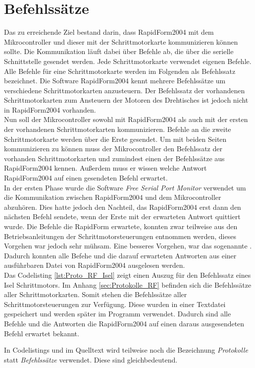 \section{Befehlssätze} 
\label{sec:Protokolle}
Das zu erreichende Ziel bestand darin, dass RapidForm2004 mit dem Mikrocontroller und dieser mit der Schrittmotorkarte kommunizieren können sollte. Die Kommunikation läuft dabei über Befehle ab, die über die serielle Schnittstelle gesendet werden. 
Jede Schrittmotorkarte verwendet eigenen Befehle. Alle Befehle für eine Schrittmotorkarte werden im Folgenden als Befehlssatz bezeichnet. Die Software RapidForm2004 kennt mehrere Befehlssätze um verschiedene Schrittmotorkarten anzusteuern. Der Befehlssatz der vorhandenen Schrittmotorkarten zum Ansteuern der Motoren des Drehtisches ist jedoch nicht in RapidForm2004 vorhanden.\\
Nun soll der Mikrocontroller sowohl mit RapidForm2004 als auch mit der ersten der vorhandenen Schrittmotorkarten kommunizieren. Befehle an die zweite Schrittmotorkarte werden über die Erste gesendet. Um mit beiden Seiten kommunizieren zu können muss der Mikrocontroller den Befehlssatz der vorhanden Schrittmotorkarten und zumindest einen der Befehlssätze aus RapidForm2004 kennen. Außerdem muss er wissen welche Antwort RapidForm2004 auf einen gesendeten Befehl erwartet. \\
In der ersten Phase wurde die Software \emph{Free Serial Port Monitor} verwendet um die Kommunikation zwischen RapidForm2004 und dem Mikrocontroller abzuhören. Dies hatte jedoch den Nachteil, das RapidForm2004 erst dann den nächsten Befehl sendete, wenn der Erste mit der erwarteten Antwort quittiert wurde. Die Befehle die RapidForm erwartete, konnten zwar teilweise aus den Betriebsanleitungen der Schrittmotorsteuerungen entnommen werden, dieses Vorgehen war jedoch sehr mühsam. Eine besseres Vorgehen, war das sogenannte . Dadurch konnten alle Befehe und die darauf erwarteten Antworten aus einer ausführbaren Datei von RapidForm2004 ausgelesen werden.\\
Das Codelisting \ref{lst:Proto_RF_Isel} zeigt einen Auszug für den Befehlssatz eines Isel Schrittmotors. Im Anhang \ref{sec:Protokolle_RF} befinden sich die Befehlssätze aller Schrittmotorkarten. Somit stehen die Befehlssätze aller Schrittmotorsteuerungen zur Verfügung. Diese wurden in einer Textdatei gespeichert und werden später im Programm verwendet. Dadurch sind alle Befehle und die Antworten die RapidForm2004 auf einen daraus ausgesendeten Befehl erwartet bekannt.
\begin{Tipp}In Codelistings und im Quelltext wird teilweise noch die Bezeichnung \emph{Protokolle} statt \emph{Befehlssätze} verwendet. Diese sind gleichbedeutend.\end{Tipp}
\lstset{language=C, basicstyle=\footnotesize, showstringspaces=false, tabsize=8}


